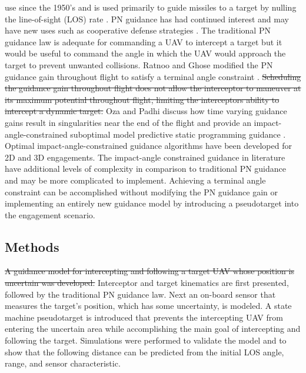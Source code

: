 \documentclass[conference]{IEEEtran}
\providecommand{\DIFadd}[1]{{\protect\color{blue}\uwave{#1}}} %
\providecommand{\DIFdel}[1]{{\protect\color{red}\sout{#1}}}                      %
\providecommand{\DIFaddend}{} %
\providecommand{\DIFdelbegin}{} %
\providecommand{\DIFdelend}{} %
\newcommand{\DIFscaledelfig}{0.5}
\newlength{\DIFdelgraphicswidth} %
\newlength{\DIFdelgraphicsheight} %
\newcommand{\DIFdelincludegraphics}[2][]{%
\sbox{\DIFdelgraphicsbox}{\DIFOincludegraphics[#1]{#2}}%
\settoboxwidth{\DIFdelgraphicswidth}{\DIFdelgraphicsbox} %
\settoboxtotalheight{\DIFdelgraphicsheight}{\DIFdelgraphicsbox} %
\scalebox{\DIFscaledelfig}{%
\parbox[b]{\DIFdelgraphicswidth}{\usebox{\DIFdelgraphicsbox}\\[-\baselineskip] \rule{\DIFdelgraphicswidth}{0em}}\llap{\resizebox{\DIFdelgraphicswidth}{\DIFdelgraphicsheight}{%
\setlength{\unitlength}{\DIFdelgraphicswidth}%
\begin{picture}(1,1)%
\thicklines\linethickness{2pt} %
{\color[rgb]{1,0,0}\put(0,0){\framebox(1,1){}}}%
{\color[rgb]{1,0,0}\put(0,0){\line( 1,1){1}}}%
{\color[rgb]{1,0,0}\put(0,1){\line(1,-1){1}}}%
\end{picture}%
}\hspace*{3pt}}} %
} %
\DeclareRobustCommand{\DIFaddend}{\DIFOaddend \let\includegraphics\DIFOincludegraphics} %
\DeclareRobustCommand{\DIFdelbegin}{\DIFOdelbegin \let\includegraphics\DIFdelincludegraphics} %
\DeclareRobustCommand{\DIFdelend}{\DIFOaddend \let\includegraphics\DIFOincludegraphics} %
\begin{document}
\DIFadd{Proportional navigation (PN) has been in }\DIFaddend use since the 1950's \cite{zarchan} and is used primarily to guide missiles to a target by nulling the line-of-sight (LOS) rate \cite{shneydor1998missile,yanushevsky2007modern}. PN guidance has had continued interest and may have new uses such as cooperative defense strategies \cite{isaac}. The traditional PN guidance law is adequate for commanding a UAV to intercept a target but it would be useful to command the angle in which the UAV would approach the target to prevent unwanted collisions. Ratnoo and Ghose modified the PN guidance gain throughout flight to satisfy a terminal angle constraint \cite{ratnoo2009satisfying}. \DIFdelbegin \DIFdel{Scheduling the guidance gain throughout flight does not allow the interceptor to maneuver at its maximum potential throughout flight, limiting the interceptors ability to intercept a dynamic target. }\DIFdelend Oza and Padhi discuss how time varying guidance gains result in singularities near the end of the flight and provide an impact-angle-constrained suboptimal model predictive static programming guidance \cite{oza2012impact}. Optimal impact-angle-constrained guidance algorithms have been developed for 2D \cite{park2013optimal} and 3D \cite{kumar2014three} engagements. The impact-angle constrained guidance in literature have additional levels of complexity in comparison to traditional PN guidance and may be more complicated to implement. Achieving a terminal angle constraint can be accomplished without modifying the PN guidance gain or implementing an entirely new guidance model by introducing a pseudotarget into the engagement scenario.



\subsection{Methods}
\DIFdelbegin \DIFdel{A guidance model for intercepting and following a target UAV whose position is uncertain was developed. }\DIFdelend Interceptor and target kinematics are first presented, followed by the traditional PN guidance law. Next an on-board sensor that measures the target's position, which has some uncertainty, is modeled. A state machine pseudotarget is introduced that prevents the intercepting UAV from entering the uncertain area while accomplishing the main goal of intercepting and following the target. Simulations were performed to validate the model and to show that the following distance can be predicted from the initial LOS angle, range, and sensor characteristic.
\end{document}
